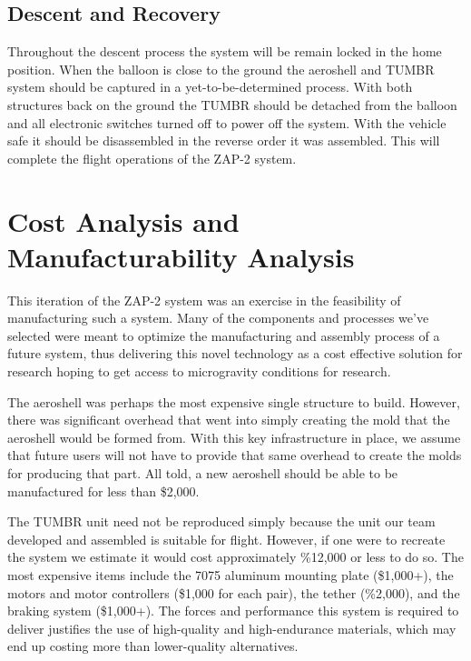 \subsection*{Descent and Recovery}

\indent\indent Throughout the descent process the system will be remain locked in the home position. When the balloon is close to the ground the aeroshell and TUMBR system should be captured in a yet-to-be-determined process. With both structures back on the ground the TUMBR should be detached from the balloon and all electronic switches turned off to power off the system. With the vehicle safe it should be disassembled in the reverse order it was assembled. This will complete the flight operations of the ZAP-2 system.


\section{Cost Analysis and Manufacturability Analysis}

\indent\indent This iteration of the ZAP-2 system was an exercise in the feasibility of manufacturing such a system. Many of the components and processes we've selected were meant to optimize the manufacturing and assembly process of a future system, thus delivering this novel technology as a cost effective solution for research hoping to get access to microgravity conditions for research. 

The aeroshell was perhaps the most expensive single structure to build. However, there was significant overhead that went into simply creating the mold that the aeroshell would be formed from. With this key infrastructure in place, we assume that future users will not have to provide that same overhead to create the molds for producing that part. All told, a new aeroshell should be able to be manufactured for less than \$2,000. 

The TUMBR unit need not be reproduced simply because the unit our team developed and assembled is suitable for flight. However, if one were to recreate the system we estimate it would cost approximately \%12,000 or less to do so. The most expensive items include the 7075 aluminum mounting plate (\$1,000+), the motors and motor controllers (\$1,000 for each pair), the tether (\%2,000), and the braking system (\$1,000+). The forces and performance this system is required to deliver justifies the use of high-quality and high-endurance materials, which may end up costing more than lower-quality alternatives. 

